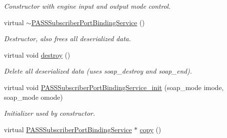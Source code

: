 \begin{DoxyCompactItemize}
\begin{DoxyCompactList}\small\item\em Constructor with engine input and output mode control. \item\end{DoxyCompactList}\item 
\hypertarget{classPASSSubscriberPortBindingService_aefd6835f6f752f175e498dc33b23207d}{
virtual \hyperlink{classPASSSubscriberPortBindingService_aefd6835f6f752f175e498dc33b23207d}{$\sim$PASSSubscriberPortBindingService} ()}
\label{classPASSSubscriberPortBindingService_aefd6835f6f752f175e498dc33b23207d}

\begin{DoxyCompactList}\small\item\em Destructor, also frees all deserialized data. \item\end{DoxyCompactList}\item 
\hypertarget{classPASSSubscriberPortBindingService_aa8dd772d7c2401d95d9b08acb0205db6}{
virtual void \hyperlink{classPASSSubscriberPortBindingService_aa8dd772d7c2401d95d9b08acb0205db6}{destroy} ()}
\label{classPASSSubscriberPortBindingService_aa8dd772d7c2401d95d9b08acb0205db6}

\begin{DoxyCompactList}\small\item\em Delete all deserialized data (uses soap\_\-destroy and soap\_\-end). \item\end{DoxyCompactList}\item 
\hypertarget{classPASSSubscriberPortBindingService_a17fc4e61abd0a2fb8ccbbd8550e0f20a}{
virtual void \hyperlink{classPASSSubscriberPortBindingService_a17fc4e61abd0a2fb8ccbbd8550e0f20a}{PASSSubscriberPortBindingService\_\-init} (soap\_\-mode imode, soap\_\-mode omode)}
\label{classPASSSubscriberPortBindingService_a17fc4e61abd0a2fb8ccbbd8550e0f20a}

\begin{DoxyCompactList}\small\item\em Initializer used by constructor. \item\end{DoxyCompactList}\item 
\hypertarget{classPASSSubscriberPortBindingService_a07ac97846d02b9182a71968b42454469}{
virtual \hyperlink{classPASSSubscriberPortBindingService}{PASSSubscriberPortBindingService} $\ast$ \hyperlink{classPASSSubscriberPortBindingService_a07ac97846d02b9182a71968b42454469}{copy} ()}
\label{classPASSSubscriberPortBindingService_a07ac97846d02b9182a71968b42454469}


\end{DoxyCompactItemize}
